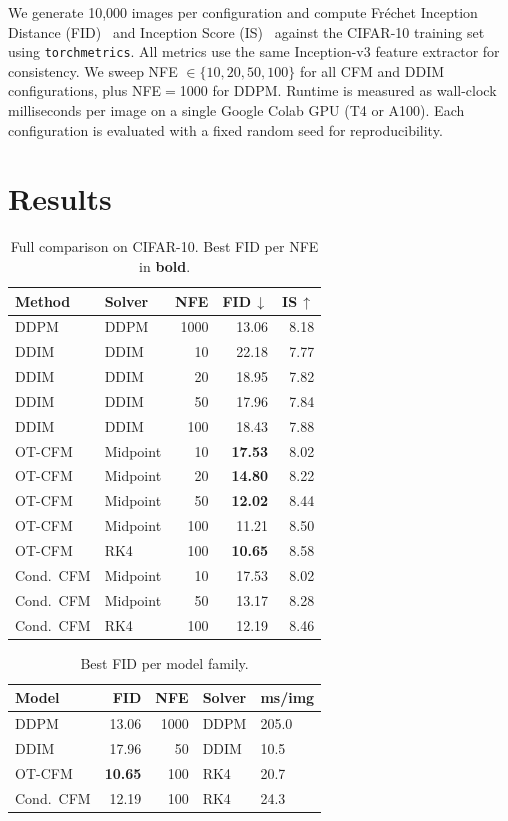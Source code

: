 \documentclass[10pt]{article}
\begin{document}
  We generate 10,000 images per configuration and compute Fr\'echet Inception Distance (FID)~\cite{heusel2017gans} and Inception Score (IS)~\cite{salimans2016improved} against the CIFAR-10 training
  set using \texttt{torchmetrics}. All metrics use the same Inception-v3 feature extractor for consistency. We sweep NFE $\in \{10, 20, 50, 100\}$ for all CFM and DDIM configurations, plus
  NFE$=$1000 for DDPM. Runtime is measured as wall-clock milliseconds per image on a single Google Colab GPU (T4 or A100). Each configuration is evaluated with a fixed random seed for
  reproducibility.

\section{Results}

\begin{table}[H]
\centering
\caption{Full comparison on CIFAR-10. Best FID per NFE in \textbf{bold}.}
\label{tab:full}
\scriptsize
\setlength{\tabcolsep}{3pt}
\begin{tabular}{@{}llrrr@{}}
\toprule
Method & Solver & NFE & FID\,$\downarrow$ & IS\,$\uparrow$ \\
\midrule
DDPM & DDPM & 1000 & 13.06 & 8.18 \\
\midrule
DDIM & DDIM & 10 & 22.18 & 7.77 \\
DDIM & DDIM & 20 & 18.95 & 7.82 \\
DDIM & DDIM & 50 & 17.96 & 7.84 \\
DDIM & DDIM & 100 & 18.43 & 7.88 \\
\midrule
OT-CFM & Midpoint & 10 & \textbf{17.53} & 8.02 \\
OT-CFM & Midpoint & 20 & \textbf{14.80} & 8.22 \\
OT-CFM & Midpoint & 50 & \textbf{12.02} & 8.44 \\
OT-CFM & Midpoint & 100 & 11.21 & 8.50 \\
OT-CFM & RK4 & 100 & \textbf{10.65} & 8.58 \\
\midrule
Cond.\ CFM & Midpoint & 10 & 17.53 & 8.02 \\
Cond.\ CFM & Midpoint & 50 & 13.17 & 8.28 \\
Cond.\ CFM & RK4 & 100 & 12.19 & 8.46 \\
\bottomrule
\end{tabular}
\end{table}

\begin{table}[H]
\centering
\caption{Best FID per model family.}
\label{tab:best}
\scriptsize
\setlength{\tabcolsep}{3pt}
\begin{tabular}{@{}lrrll@{}}
\toprule
Model & FID & NFE & Solver & ms/img \\
\midrule
DDPM & 13.06 & 1000 & DDPM & 205.0 \\
DDIM & 17.96 & 50 & DDIM & 10.5 \\
OT-CFM & \textbf{10.65} & 100 & RK4 & 20.7 \\
Cond.\ CFM & 12.19 & 100 & RK4 & 24.3 \\
\bottomrule
\end{tabular}
\end{table}
\end{document}

